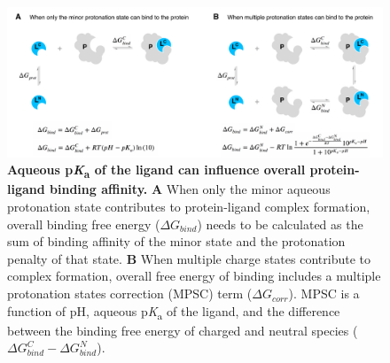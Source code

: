\documentclass[9pt,lineno,final]{elife}
\newcommand{\pKa}{p\textit{K}\textsubscript{a}}
\begin{document}
\begin{figure}[h]
\centering
\includegraphics[width=1.0\linewidth]{figures/pKa-effects-on-protein-ligand-binding.pdf}
\caption{ {\bf Aqueous \pKa{} of the ligand can influence overall protein-ligand binding affinity.} {\bf A} When only the minor aqueous protonation state contributes to protein-ligand complex formation, overall binding free energy ($\Delta G_{bind}$) needs to be calculated as the sum of binding affinity of the minor state and the protonation penalty of that state. {\bf B} When multiple charge states contribute to complex formation, overall free energy of binding includes a multiple protonation states correction (MPSC) term ($\Delta G_{corr}$). MPSC is a function of pH, aqueous \pKa{} of the ligand, and the difference between the binding free energy of charged and neutral species ($\Delta G_{bind}^{C} - \Delta G_{bind}^{N}$).
}
\label{fig:pKa-effects-on-protein-ligand-binding}
\end{figure}
\end{document}
